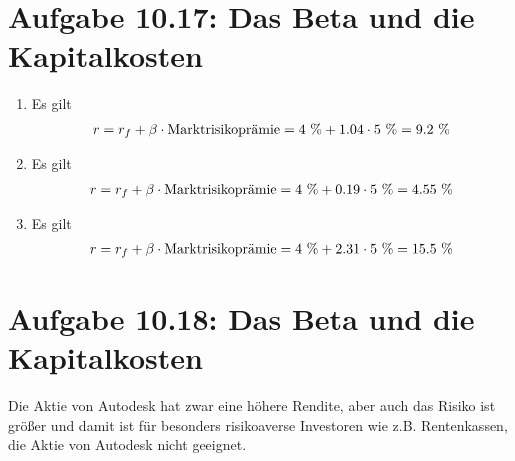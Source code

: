 \documentclass{article}
\begin{document}
	\section*{Aufgabe 10.17: Das Beta und die Kapitalkosten}
	\begin{enumerate}[label=(\alph*)]
		\item Es gilt
		\begin{align}
			r = r_f + \beta\cdot\text{Marktrisikoprämie} = 4\text{ \%} + 1.04\cdot 5\text{ \%} = 9.2\text{ \%}\notag
		\end{align}
		\item Es gilt
		\begin{align}
			r = r_f + \beta\cdot\text{Marktrisikoprämie} = 4\text{ \%} + 0.19\cdot 5\text{ \%} = 4.55\text{ \%}\notag
		\end{align}
		\item Es gilt
		\begin{align}
			r = r_f + \beta\cdot\text{Marktrisikoprämie} = 4\text{ \%} + 2.31\cdot 5\text{ \%} = 15.5\text{ \%}\notag
		\end{align}
	\end{enumerate}
	
	\section*{Aufgabe 10.18: Das Beta und die Kapitalkosten}
	Die Aktie von Autodesk hat zwar eine höhere Rendite, aber auch das Risiko ist größer und damit ist für besonders risikoaverse Investoren wie z.B. Rentenkassen, die Aktie von Autodesk nicht geeignet.
	
\end{document}
